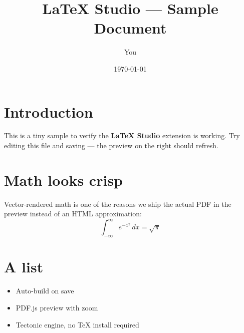 \documentclass[11pt]{article}
\title{LaTeX Studio --- Sample Document}
\author{You}
\date{\today}
\begin{document}
\maketitle

\section{Introduction}
This is a tiny sample to verify the \textbf{LaTeX Studio} extension is working.
Try editing this file and saving --- the preview on the right should refresh.

\section{Math looks crisp}
Vector-rendered math is one of the reasons we ship the actual PDF in the preview
instead of an HTML approximation:
\begin{equation}
  \int_{-\infty}^{\infty} e^{-x^2}\,dx = \sqrt{\pi}
\end{equation}

\section{A list}
\begin{itemize}
  \item Auto-build on save
  \item PDF.js preview with zoom
  \item Tectonic engine, no TeX install required
\end{itemize}
\end{document}
